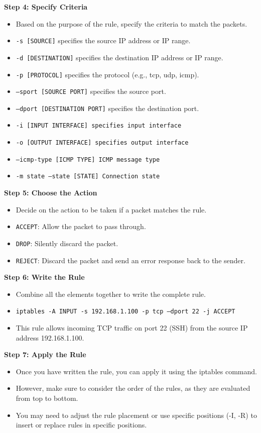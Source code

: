{		\textbf{Step 4: Specify Criteria}
		\begin{itemize}
			\item Based on the purpose of the rule, specify the criteria to match the packets.
			\item \texttt{-s [SOURCE]} specifies the source IP address or IP range.
			\item \texttt{-d [DESTINATION]} specifies the destination IP address or IP range.
			\item \texttt{-p [PROTOCOL]} specifies the protocol (e.g., tcp, udp, icmp).
			\item \texttt{--sport [SOURCE PORT]} specifies the source port.
			\item \texttt{--dport [DESTINATION PORT]} specifies the destination port.
			\item \texttt{-i [INPUT INTERFACE] specifies input interface }
			\item \texttt{-o [OUTPUT INTERFACE] specifies output interface}
			\item \texttt{--icmp-type [ICMP TYPE] ICMP message type}
			\item \texttt{-m state --state [STATE] Connection state}
		\end{itemize}
	
	
		
		\textbf{Step 5: Choose the Action}
		\begin{itemize}
			\item Decide on the action to be taken if a packet matches the rule.
			\item \texttt{ACCEPT}: Allow the packet to pass through.
			\item \texttt{DROP}: Silently discard the packet.
			\item \texttt{REJECT}: Discard the packet and send an error response back to the sender.
		\end{itemize}
		
		\textbf{Step 6: Write the Rule}
		\begin{itemize}
			\item Combine all the elements together to write the complete rule.
			\item \texttt{iptables -A INPUT -s 192.168.1.100 -p tcp --dport 22 -j ACCEPT}
			\item This rule allows incoming TCP traffic on port 22 (SSH) from the source IP address 192.168.1.100.
		\end{itemize}
		
		\textbf{Step 7: Apply the Rule}
		\begin{itemize}
			\item Once you have written the rule, you can apply it using the iptables command.
			\item However, make sure to consider the order of the rules, as they are evaluated from top to bottom.
			\item You may need to adjust the rule placement or use specific positions (-I, -R) to insert or replace rules in specific positions.
		\end{itemize}}

